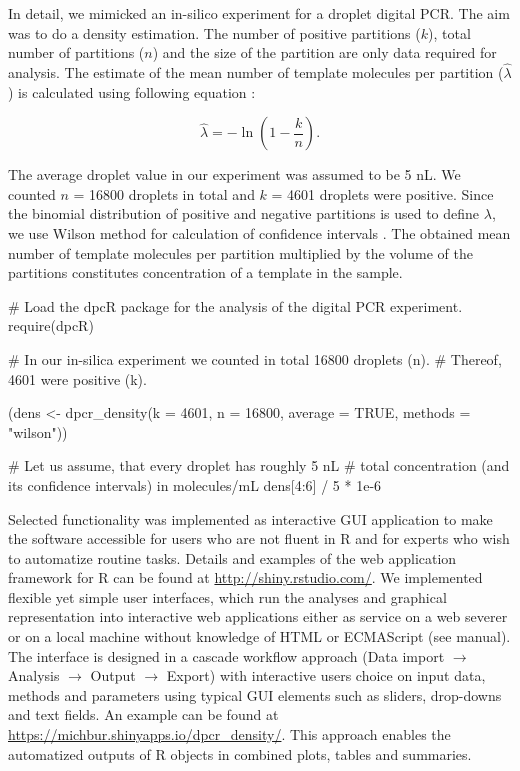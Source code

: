 In detail, we mimicked an in-silico experiment for a droplet digital PCR. The aim was to do a density 
estimation. The number of positive partitions ($k$), total number of partitions ($n$) and 
the size of the partition are only data required for analysis. The estimate of 
the mean number of template molecules per partition ($\hat \lambda$) is 
calculated using following equation \citep{huggett_2013}:

\begin{equation}
\hat{\lambda} =  -\ln{(1 - \frac{k}{n})}.
\end{equation}

The average droplet value in our experiment was assumed to be 5 nL. We counted 
$n$ = 16800 droplets in total and $k$ = 4601 droplets were positive. Since the 
binomial distribution of positive and negative partitions is used to define 
$\lambda$, we use Wilson method for calculation of confidence intervals 
\citep{brown_2001}. The obtained mean number of template molecules per partition 
multiplied by the volume of the partitions constitutes concentration of a 
template in the sample.

\begin{example}
# Load the dpcR package for the analysis of the digital PCR experiment.
require(dpcR)

# In our in-silica experiment we counted in total 16800 droplets (n). 
# Thereof, 4601 were positive (k).

(dens <- dpcr_density(k = 4601, n = 16800, average = TRUE, methods = "wilson"))

# Let us assume, that every droplet has roughly 5 nL 
# total concentration (and its confidence intervals) in molecules/mL
dens[4:6] / 5 * 1e-6
\end{example}

Selected functionality was implemented as interactive  GUI 
application to make the software accessible for users who are not fluent in R 
and for experts who wish to automatize routine tasks. Details and examples of 
the  web application framework for R can be found at 
\url{http://shiny.rstudio.com/}. We implemented flexible yet simple user 
interfaces, which run the analyses and graphical representation into interactive 
web applications either as service on a web severer or on a local machine 
without knowledge of HTML or ECMAScript (see  manual). The 
interface is designed in a cascade workflow approach (Data import $\rightarrow$ 
Analysis $\rightarrow$ Output $\rightarrow$ Export) with interactive users 
choice on input data, methods and parameters using typical GUI elements such as 
sliders, drop-downs and text fields. An example can be found at 
\url{https://michbur.shinyapps.io/dpcr_density/}. This approach enables the 
automatized outputs of R objects in combined plots, tables and summaries.

